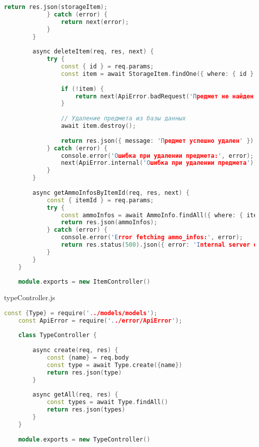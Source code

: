 \begin{lstlisting}[language=C++]
				return res.json(storageItem);
			} catch (error) {
				return next(error);
			}
		}
		
		async deleteItem(req, res, next) {
			try {
				const { id } = req.params;
				const item = await StorageItem.findOne({ where: { id } });
				
				if (!item) {
					return next(ApiError.badRequest('Предмет не найден'));
				}
				
				// Удаление предмета из базы данных
				await item.destroy();
				
				return res.json({ message: 'Предмет успешно удален' });
			} catch (error) {
				console.error('Ошибка при удалении предмета:', error);
				next(ApiError.internal('Ошибка при удалении предмета'));
			}
		}
		
		async getAmmoInfosByItemId(req, res, next) {
			const { itemId } = req.params;
			try {
				const ammoInfos = await AmmoInfo.findAll({ where: { itemId } });
				return res.json(ammoInfos);
			} catch (error) {
				console.error('Error fetching ammo_infos:', error);
				return res.status(500).json({ error: 'Internal server error' });
			}
		}
	}
	
	module.exports = new ItemController()
\end{lstlisting}
	
typeController.js
\begin{lstlisting}[language=C++]
	const {Type} = require('../models/models');
	const ApiError = require('../error/ApiError');
	
	class TypeController {
		
		async create(req, res) {
			const {name} = req.body
			const type = await Type.create({name})
			return res.json(type)
		}
		
		async getAll(req, res) {
			const types = await Type.findAll()
			return res.json(types)
		}
	}
	
	module.exports = new TypeController()
\end{lstlisting}


